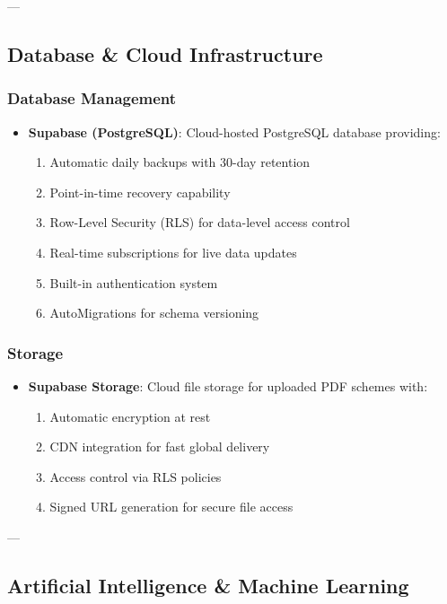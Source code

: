 ---

\subsection{Database \& Cloud Infrastructure}

\subsubsection{Database Management}
\begin{itemize}
    \item \textbf{Supabase (PostgreSQL)}: Cloud-hosted PostgreSQL database providing:
    \begin{enumerate}
        \item Automatic daily backups with 30-day retention
        \item Point-in-time recovery capability
        \item Row-Level Security (RLS) for data-level access control
        \item Real-time subscriptions for live data updates
        \item Built-in authentication system
        \item AutoMigrations for schema versioning
    \end{enumerate}
\end{itemize}

\subsubsection{Storage}
\begin{itemize}
    \item \textbf{Supabase Storage}: Cloud file storage for uploaded PDF schemes with:
    \begin{enumerate}
        \item Automatic encryption at rest
        \item CDN integration for fast global delivery
        \item Access control via RLS policies
        \item Signed URL generation for secure file access
    \end{enumerate}
\end{itemize}

---

\subsection{Artificial Intelligence \& Machine Learning}

